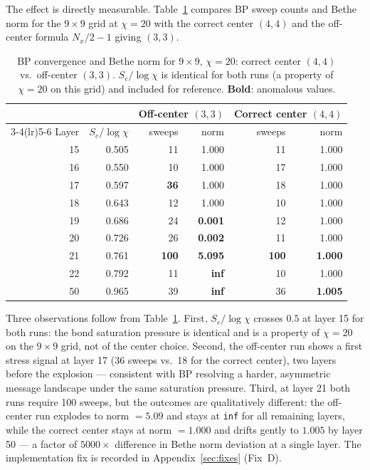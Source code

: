 The effect is directly measurable.
Table~\ref{tab:center_compare} compares BP sweep counts and Bethe norm
for the $9\times9$ grid at $\chi=20$ with the correct center $(4,4)$
and the off-center formula $N_x/2 - 1$ giving $(3,3)$.

\begin{table}[ht]
\centering
\caption{BP convergence and Bethe norm for $9\times9$, $\chi=20$: correct
  center $(4,4)$ vs.\ off-center $(3,3)$.
  $S_e/\log\chi$ is identical for both runs (a property of $\chi=20$ on
  this grid) and included for reference.
  \textbf{Bold}: anomalous values.}
\label{tab:center_compare}
\small
\begin{tabular}{r r rr rr}
\toprule
 & & \multicolumn{2}{c}{Off-center $(3,3)$} & \multicolumn{2}{c}{Correct center $(4,4)$} \\
\cmidrule(lr){3-4}\cmidrule(lr){5-6}
Layer & $S_e/\log\chi$ & sweeps & norm & sweeps & norm \\
\midrule
15 & 0.505 & 11    & 1.000 & 11    & 1.000 \\
16 & 0.550 & 10    & 1.000 & 17    & 1.000 \\
17 & 0.597 & \textbf{36} & 1.000 & 18 & 1.000 \\
18 & 0.643 & 12    & 1.000 & 10    & 1.000 \\
19 & 0.686 & 24    & \textbf{0.001} & 12 & 1.000 \\
20 & 0.726 & 26    & \textbf{0.002} & 11 & 1.000 \\
21 & 0.761 & \textbf{100} & \textbf{5.095} & \textbf{100} & \textbf{1.000} \\
22 & 0.792 & 11    & \textbf{inf}   & 10  & 1.000 \\
50 & 0.965 & 39    & \textbf{inf}   & 36  & \textbf{1.005} \\
\bottomrule
\end{tabular}
\end{table}

Three observations follow from Table~\ref{tab:center_compare}.
First, $S_e/\log\chi$ crosses $0.5$ at layer 15 for both runs: the bond
saturation pressure is identical and is a property of $\chi=20$ on the
$9\times9$ grid, not of the center choice.
Second, the off-center run shows a first stress signal at layer 17
(36 sweeps vs.\ 18 for the correct center), two layers before the
explosion — consistent with BP resolving a harder, asymmetric message
landscape under the same saturation pressure.
Third, at layer 21 both runs require 100 sweeps, but the outcomes are
qualitatively different: the off-center run explodes to norm $= 5.09$
and stays at \texttt{inf} for all remaining layers, while the correct
center stays at norm $= 1.000$ and drifts gently to $1.005$ by layer 50
--- a factor of $5000\times$ difference in Bethe norm deviation at a
single layer.
The implementation fix is recorded in Appendix~\ref{sec:fixes} (Fix~D).

